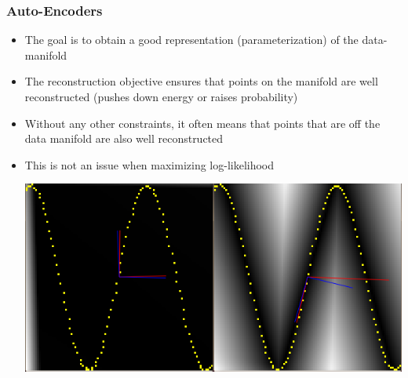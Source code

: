 \documentclass{beamer}
\begin{document}
\begin{frame}
\frametitle{Auto-Encoders}
\begin{itemize}
\item{The goal is to obtain a good representation (parameterization) of the data-manifold}
\item{The reconstruction objective ensures that points on the manifold are well reconstructed (pushes down energy or raises probability)} 
\item{Without any other constraints, it often means that points that are off the data manifold are also well reconstructed} 
\item{This is not an issue when maximizing log-likelihood}  
\begin{center}
\includegraphics[scale = 0.2]{psh_and_pull.png} 
\end{center} 
\end{itemize} 
\end{frame} 
\end{document}
